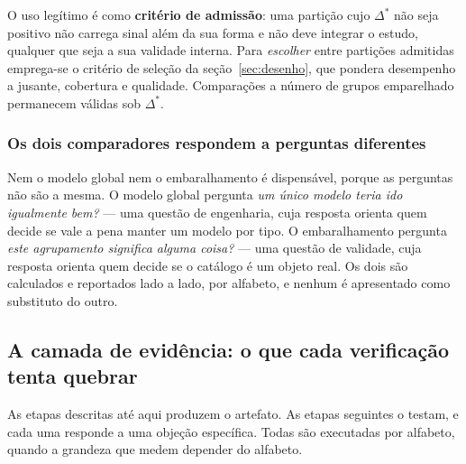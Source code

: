 O uso legítimo é como \textbf{critério de admissão}: uma partição cujo $\Delta^{*}$ não seja
positivo não carrega sinal além da sua forma e não deve integrar o estudo, qualquer que seja a sua
validade interna. Para \emph{escolher} entre partições admitidas emprega-se o critério de seleção da
seção~\ref{sec:desenho}, que pondera desempenho a jusante, cobertura e qualidade. Comparações a
número de grupos emparelhado permanecem válidas sob $\Delta^{*}$.

\subsubsection*{Os dois comparadores respondem a perguntas diferentes}

Nem o modelo global nem o embaralhamento é dispensável, porque as perguntas não são a mesma. O
modelo global pergunta \emph{um único modelo teria ido igualmente bem?} --- uma questão de
engenharia, cuja resposta orienta quem decide se vale a pena manter um modelo por tipo. O
embaralhamento pergunta \emph{este agrupamento significa alguma coisa?} --- uma questão de validade,
cuja resposta orienta quem decide se o catálogo é um objeto real. Os dois são calculados e
reportados lado a lado, por alfabeto, e nenhum é apresentado como substituto do outro.

\subsection{A camada de evidência: o que cada verificação tenta quebrar}\label{sec:evidencia}

As etapas descritas até aqui produzem o artefato. As etapas seguintes o testam, e cada uma responde
a uma objeção específica. Todas são executadas por alfabeto, quando a grandeza que medem depender do alfabeto.

